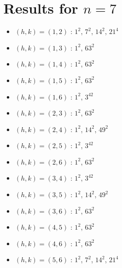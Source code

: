 \section{Results for $n=7$}
\begin{itemize}
\item $(h,k)=(1,2)$ : $1^{2}$, $7^{2}$, $14^{2}$, $21^{4}$
\item $(h,k)=(1,3)$ : $1^{2}$, $63^{2}$
\item $(h,k)=(1,4)$ : $1^{2}$, $63^{2}$
\item $(h,k)=(1,5)$ : $1^{2}$, $63^{2}$
\item $(h,k)=(1,6)$ : $1^{2}$, $3^{42}$
\item $(h,k)=(2,3)$ : $1^{2}$, $63^{2}$
\item $(h,k)=(2,4)$ : $1^{2}$, $14^{2}$, $49^{2}$
\item $(h,k)=(2,5)$ : $1^{2}$, $3^{42}$
\item $(h,k)=(2,6)$ : $1^{2}$, $63^{2}$
\item $(h,k)=(3,4)$ : $1^{2}$, $3^{42}$
\item $(h,k)=(3,5)$ : $1^{2}$, $14^{2}$, $49^{2}$
\item $(h,k)=(3,6)$ : $1^{2}$, $63^{2}$
\item $(h,k)=(4,5)$ : $1^{2}$, $63^{2}$
\item $(h,k)=(4,6)$ : $1^{2}$, $63^{2}$
\item $(h,k)=(5,6)$ : $1^{2}$, $7^{2}$, $14^{2}$, $21^{4}$
\end{itemize}
